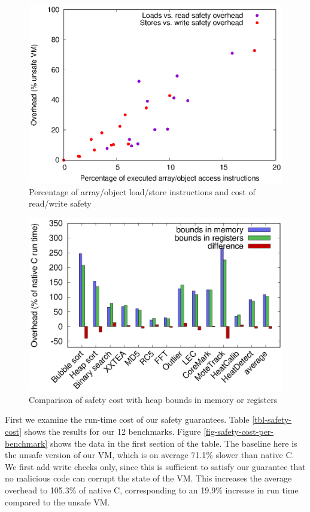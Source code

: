 \begin{figure}
\centering
\includegraphics[width=\mygraphsize]{safety-ld-st-percentage-vs-overhead.eps}
\caption{Percentage of array/object load/store instructions and cost of read/write safety}
\label{fig-safety-ld-st-percentage-vs-overhead}
\end{figure}

\begin{figure}
\centering
\includegraphics[width=\mygraphsize]{safety-cost-diff-using-regs.eps}
\caption{Comparison of safety cost with heap bounds in memory or registers}
\label{fig-safety-cost-memory-or-registers}
\end{figure}

First we examine the run-time cost of our safety guarantees. Table \ref{tbl-safety-cost} shows the results for our 12 benchmarks. Figure \ref{fig-safety-cost-per-benchmark} shows the data in the first section of the table. The baseline here is the unsafe version of our VM, which is on average 71.1\% slower than native C. We first add write checks only, since this is sufficient to satisfy our guarantee that no malicious code can corrupt the state of the VM. This increases the average overhead to 105.3\% of native C, corresponding to an 19.9\% increase in run time compared to the unsafe VM.

